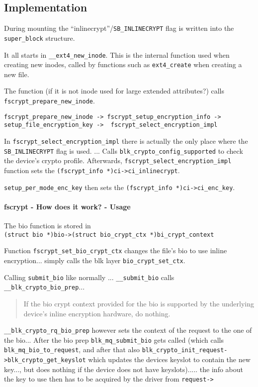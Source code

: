 \subsection{Implementation}

During mounting the ``inlinecrypt''/\verb|SB_INLINECRYPT|  flag is written into the \verb|super_block| structure.

It all starts in \verb|__ext4_new_inode|. This is the internal function used when creating new inodes, called by functions such as \verb|ext4_create| when creating a new file.

The function (if it is not inode used for large extended attributes?) calls \verb|fscrypt_prepare_new_inode|.

\verb|fscrypt_prepare_new_inode -> fscrypt_setup_encryption_info ->| \verb|setup_file_encryption_key ->  fscrypt_select_encryption_impl|

In \verb|fscrypt_select_encryption_impl| there is actually the only place where the \verb|SB_INLINECRYPT| flag is used.
... Calls \verb|blk_crypto_config_supported| to check the device's crypto profile.
Afterwards, \verb|fscrypt_select_encryption_impl| function sets the \verb|(fscrypt_info *)ci->ci_inlinecrypt|.

\verb|setup_per_mode_enc_key| then sets the \verb|(fscrypt_info *)ci->ci_enc_key|.

\paragraph{fscrypt - How does it work? - Usage}

The bio function is stored in \\ \verb|(struct bio *)bio->(struct bio_crypt_ctx *)bi_crypt_context|

Function \verb|fscrypt_set_bio_crypt_ctx| changes the file's bio to use inline encryption... simply calls the blk layer \verb|bio_crypt_set_ctx|.

Calling \verb|submit_bio| like normally ... \verb|__submit_bio| calls \verb|__blk_crypto_bio_prep|...

\blockquote{If the bio crypt context provided for the bio is supported by the underlying device's inline encryption hardware, do nothing.}

\verb|__blk_crypto_rq_bio_prep| however sets the context of the request to the one of the bio... 
After the bio prep  \verb|blk_mq_submit_bio| gets called (which calls \verb|blk_mq_bio_to_request|, and after that also \verb|blk_crypto_init_request->blk_crypto_get_keyslot| which updates the devices keyslot to contain the new key..., but does nothing if the device does not have keyslots)..... the info about the key to use then has to be acquired by the driver from \verb|request->|


